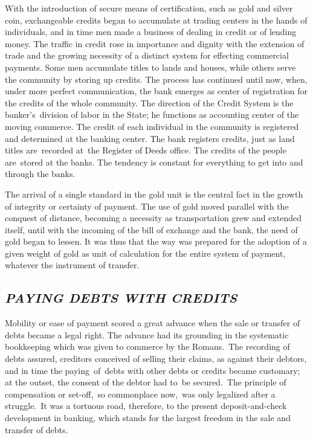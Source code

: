 \documentclass[openany,nobib]{tufte-book}
\begin{document}
With the introduction of secure means of certification, such as gold and
silver coin, exchangeable credits began to accumulate at trading centers
in the hands of individuals, and in time men made a business of dealing
in credit or of lending money. The traffic in credit rose in importance
and dignity with the extension of trade and the growing necessity of a
distinct system for effecting commercial payments. Some men accumulate
titles to lands and houses, while others serve the community by storing
up credits. The process has continued until now, when, under more
perfect communication, the bank emerges as center of registration for
the credits of the whole community. The direction of the Credit System
is the banker's~division of labor in the State; he functions as
accounting center of the moving commerce. The credit of each individual
in the community is registered and determined at the banking center. The
bank registers credits, just as land titles are~recorded at~the Register
of Deeds office. The credits of the people are~stored at the banks. The
tendency is constant for everything to get into and through the banks.~

The arrival of a single standard in the gold unit is the central fact in
the growth of integrity or certainty of payment. The use of gold moved
parallel with the conquest of distance, becoming a necessity as
transportation grew and extended itself, until with the incoming of the
bill of exchange and the bank, the need of gold began to lessen. It was
thus that the way was prepared for the adoption of a given weight of
gold as unit of calculation for the entire system of payment, whatever
the instrument of transfer.~

\hypertarget{paying-debts-with-credits}{%
\subsection{\texorpdfstring{\emph{PAYING DEBTS WITH
CREDITS}}{PAYING DEBTS WITH CREDITS}}\label{paying-debts-with-credits}}

Mobility or ease of payment scored a great advance when the sale or
transfer of debts became a legal right. The advance had its grounding in
the systematic bookkeeping which was given to commerce by the
Romans.~The recording of debts assured, creditors conceived of selling
their claims, as against their debtors, and in time the paying~of~debts
with other debts or credits became customary; at the outset, the consent
of the debtor had to~be secured.~The principle of compensation or
set-off,~so commonplace now,~was only legalized after a struggle.~It was
a tortuous road, therefore, to the present deposit-and-check development
in banking, which stands for the largest freedom in the sale and
transfer of debts.~
\end{document}
